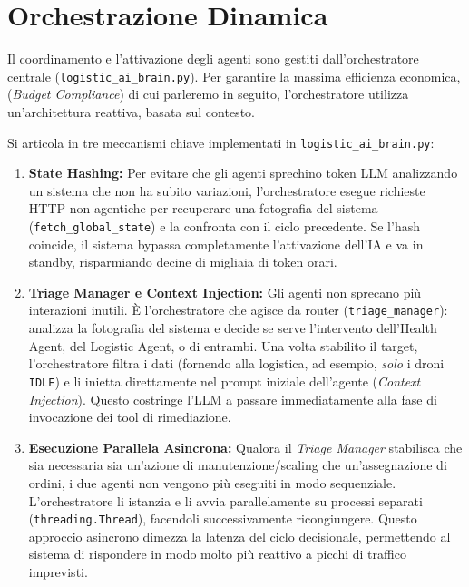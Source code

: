 \section{Orchestrazione Dinamica}
\label{sec:logistic_ai_brain}

Il coordinamento e l'attivazione degli agenti sono gestiti dall'orchestratore centrale (\texttt{logistic\_ai\_brain.py}). Per garantire la massima efficienza economica, (\textit{Budget Compliance}) di cui parleremo in seguito, l'orchestratore utilizza un'architettura reattiva, basata sul contesto.

Si articola in tre meccanismi chiave implementati in \texttt{logistic\_ai\_brain.py}:

\begin{enumerate}
    \item \textbf{State Hashing:} Per evitare che gli agenti sprechino token LLM analizzando un sistema che non ha subito variazioni, l'orchestratore esegue richieste HTTP non agentiche per recuperare una fotografia del sistema (\texttt{fetch\_global\_state}) e la confronta con il ciclo precedente. Se l'hash coincide, il sistema bypassa completamente l'attivazione dell'IA e va in standby, risparmiando decine di migliaia di token orari.
    
    \item \textbf{Triage Manager e Context Injection:} Gli agenti non sprecano più interazioni inutili. È l'orchestratore che agisce da router (\texttt{triage\_manager}): analizza la fotografia del sistema e decide se serve l'intervento dell'Health Agent, del Logistic Agent, o di entrambi. Una volta stabilito il target, l'orchestratore filtra i dati (fornendo alla logistica, ad esempio, \textit{solo} i droni \texttt{IDLE}) e li inietta direttamente nel prompt iniziale dell'agente (\textit{Context Injection}). Questo costringe l'LLM a passare immediatamente alla fase di invocazione dei tool di rimediazione.
    
    \item \textbf{Esecuzione Parallela Asincrona:} Qualora il \textit{Triage Manager} stabilisca che sia necessaria sia un'azione di manutenzione/scaling che un'assegnazione di ordini, i due agenti non vengono più eseguiti in modo sequenziale. L'orchestratore li istanzia e li avvia parallelamente su processi separati (\texttt{threading.Thread}), facendoli successivamente ricongiungere. Questo approccio asincrono dimezza la latenza del ciclo decisionale, permettendo al sistema di rispondere in modo molto più reattivo a picchi di traffico imprevisti.
\end{enumerate}